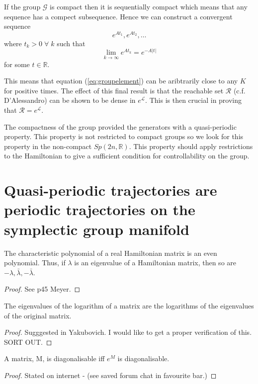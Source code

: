 If the group $\mathcal{G}$ is compact then it is sequentially compact which means that any sequence has a compect subsequence. Hence we can construct a convergent sequence
\begin{equation}
e^{At_1},e^{At_2},\ldots
\end{equation}
where $t_k > 0 \; \forall \; k$ such that
\begin{equation}
\lim_{k \to \infty} e^{At_k} = e^{-A|t|}
\end{equation}
for some $t \in \mathbb{R}$.

This means that equation (\ref{eq:groupelement}) can be aribtrarily close to any $K$ for positive times. The effect of this final result is that the reachable set $\mathcal{R}$ (c.f. D'Alessandro) can be shown to be dense in $e^{\mathcal{L}}$. This is then crucial in proving that $\mathcal{R} = e^{\mathcal{L}}$.

The compactness of the group provided the generators with a quasi-periodic property. This property is not restricted to compact groups so we look for this property in the non-compact $Sp(2n,\mathbb{R})$. This property should apply restrictions to the Hamiltonian to give a sufficient condition for controllability on the group.

\section{Quasi-periodic trajectories are periodic trajectories on the symplectic group manifold}

\begin{lemma} The characteristic polynomial of a real Hamiltonian matrix is an even polynomial. Thus, if $\lambda$ is an eigenvalue of a Hamiltonian matrix, then so are $-\lambda, \bar{\lambda}, -\bar{\lambda}$. \label{lem:hamevalues} 
\end{lemma}
\begin{proof}
See p45 Meyer. 
\end{proof}

\begin{lemma} The eigenvalues of the logarithm of a matrix are the logarithms of the eigenvalues of the original matrix. \label{lem:eigenlog} \end{lemma} 
\begin{proof}
Sugggested in Yakubovich. I would like to get a proper verification of this. SORT OUT.
\end{proof}

\begin{lemma} A matrix, M, is diagonalisable iff $e^M$ is diagonalisable. \label{lem:eadiag} \end{lemma} 
\begin{proof}
Stated on internet - (see saved forum chat in favourite bar.)
\end{proof}

